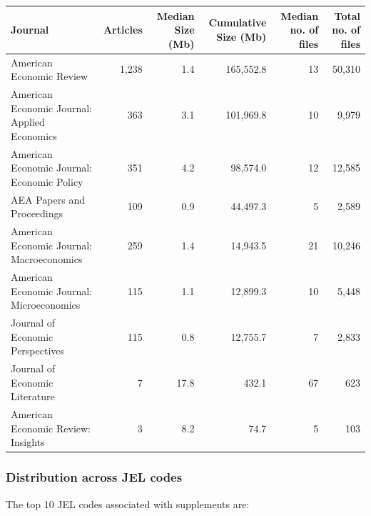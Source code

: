 \documentclass[]{article}
\begin{document}
\begin{table}[H]
\centering
\begin{tabular}{l|r|r|r|r|r}
\hline
Journal & Articles & Median Size (Mb) & Cumulative Size (Mb) & Median no. of files & Total no. of files\\
\hline
American Economic Review & 1,238 & 1.4 & 165,552.8 & 13 & 50,310\\
\hline
American Economic Journal: Applied Economics & 363 & 3.1 & 101,969.8 & 10 & 9,979\\
\hline
American Economic Journal: Economic Policy & 351 & 4.2 & 98,574.0 & 12 & 12,585\\
\hline
AEA Papers and Proceedings & 109 & 0.9 & 44,497.3 & 5 & 2,589\\
\hline
American Economic Journal: Macroeconomics & 259 & 1.4 & 14,943.5 & 21 & 10,246\\
\hline
American Economic Journal: Microeconomics & 115 & 1.1 & 12,899.3 & 10 & 5,448\\
\hline
Journal of Economic Perspectives & 115 & 0.8 & 12,755.7 & 7 & 2,833\\
\hline
Journal of Economic Literature & 7 & 17.8 & 432.1 & 67 & 623\\
\hline
American Economic Review: Insights & 3 & 8.2 & 74.7 & 5 & 103\\
\hline
\end{tabular}
\end{table}

\hypertarget{distribution-across-jel-codes}{%
\subsubsection{Distribution across JEL
codes}\label{distribution-across-jel-codes}}

The top 10 JEL codes associated with supplements are:
\end{document}
